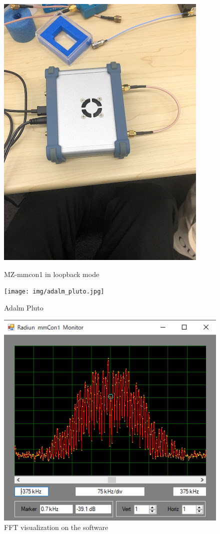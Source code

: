 \documentclass[a4paper,12pt]{report}
\begin{document}
\begin{figure}
  \centering
  \begin{minipage}{0.45\textwidth}
    \centering
    \includegraphics[clip, keepaspectratio, width=0.9\linewidth]{img/mz_mmcon1_loopback.jpg}
    \caption{MZ-mmcon1 in loopback mode}
    \label{fig:mz_mmcon1_loopback}
  \end{minipage}\hfill
  \begin{minipage}{0.45\textwidth}
    \centering
    \texttt{[image: img/adalm\_pluto.jpg]}
    \caption{Adalm Pluto}
    \label{img:adalm_pluto}
  \end{minipage}\hfill
\end{figure}

\begin{figure}
  \begin{center}
    \includegraphics[clip, keepaspectratio, width=0.5\linewidth]{img/mz_mmcon1_fft_viz.png}
    \caption{FFT visualization on the software}
    \label{fig:mz_mmcon1_fft_viz}
  \end{center}
\end{figure}
\end{document}
